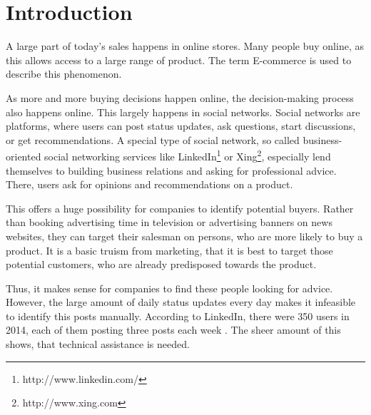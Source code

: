 


\section{Introduction}
\label{sec:introduction}

A large part of today's sales  happens in online stores.
Many people buy online, as this allows access to a large range of product.
The term E-commerce is used to describe this phenomenon.

As more and more buying decisions happen online, the decision-making process also happens online.
This largely happens in social networks.
Social networks are platforms, where users can post status updates, ask questions, start discussions, or get recommendations.
A special type of social network, so called business-oriented social networking services like LinkedIn\footnote{http://www.linkedin.com/} or Xing\footnote{http://www.xing.com}, especially lend themselves to building business relations and asking for professional advice.
There, users ask for opinions and recommendations on a product.

This offers a huge possibility for companies to identify potential buyers.
Rather than booking advertising time in television or advertising banners on news websites, they can target their salesman on persons, who are more likely to buy a product.
It is a basic truism from marketing, that it is best to target those potential customers, who are already predisposed towards the product. 

Thus, it makes sense for companies to find these people looking for advice.
However, the large amount of daily status updates every day makes it infeasible to identify this posts manually.
According to LinkedIn, there were 350 users in 2014, each of them posting three posts each week .
The sheer amount of this shows, that technical assistance is needed.

